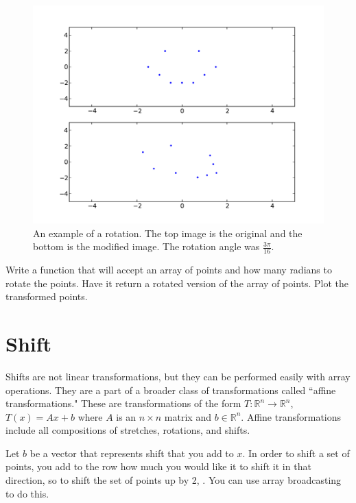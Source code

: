 \begin{figure}[H]
\includegraphics[scale = .5]{rotate.pdf}
\caption{
An example of a rotation.
The top image is the original and the bottom is the modified image.
The rotation angle was $\frac{3\pi}{16}$.}
\end{figure}

\begin{problem}
Write a function that will accept an array of points and how many radians to rotate the points.
Have it return a rotated version of the array of points.
Plot the transformed points.
\end{problem}

\section*{Shift}

Shifts are not linear transformations, but they can be performed easily with array operations.
They are a part of a broader class of transformations called ``affine transformations."
These are transformations of the form $T: \mathbb{R}^n \to \mathbb{R}^n$, $T(x) = A x + b$ where $A$ is an $n\times n$ matrix and $b \in \mathbb{R}^n$.
Affine transformations include all compositions of stretches, rotations, and shifts.

Let $b$ be a vector that represents shift that you add to $x$.
In order to shift a set of points, you add to the row how much you would like it to shift it in that direction, so to shift the set of points up by 2, .
You can use array broadcasting to do this.

